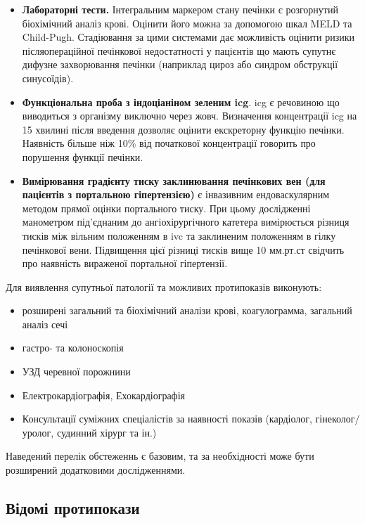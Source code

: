 \begin{refsection}
\begin{itemize}
  \item \textbf{Лабораторні тести.} Інтегральним маркером  стану печінки є розгорнутий біохімічний аналіз крові. Оцінити його можна за допомогою шкал MELD та Child-Pugh. Стадіювання за цими системами дає можливість оцінити ризики післяопераційної печінкової недостатності у пацієнтів що мають супутнє дифузне захворювання печінки (наприклад цироз або синдром обструкції синусоїдів).
  
  \item \textbf{Функціональна проба з індоціаніном зеленим \acrshort{icg}}. \acrshort{icg} є речовиною що виводиться з організму виключно через жовч. Визначення концентрації \acrshort{icg} на 15 хвилині після введення дозволяє оцінити екскреторну функцію печінки. Наявність більше ніж 10\% від початкової концентрації говорить про порушення функції печінки.
  
  \item \textbf{Вимірювання градієнту тиску заклинювання печінкових вен (для пацієнтів з портальною гіпертензією)} є інвазивним ендоваскулярним методом прямої оцінки портального тиску. При цьому дослідженні манометром під'єднаним до  ангіохірургічного катетера вимірюється різниця тисків між вільним положенням в \acrshort{ivc} та заклиненим положенням в гілку печінкової вени. Підвищення цієї різниці тисків вище 10 мм.рт.ст свідчить про наявність вираженої портальної гіпертензії.

\end{itemize}

Для виявлення супутньої патології та можливих протипоказів виконують:

\begin{itemize}
  \item розширені загальний та біохімічний аналізи крові, коагулограмма, загальний аналіз сечі
  \item гастро- та колоноскопія
  \item УЗД черевної порожнини
  \item Електрокардіографія, Ехокардіографія
  \item Консультації суміжних спеціалістів за наявності показів (кардіолог, гінеколог/уролог, судинний хірург та ін.) 
\end{itemize}

Наведений перелік обстеженнь є базовим, та за необхідності може бути розширений додатковими дослідженнями. 

\subsection{Відомі протипокази}


\end{refsection}
